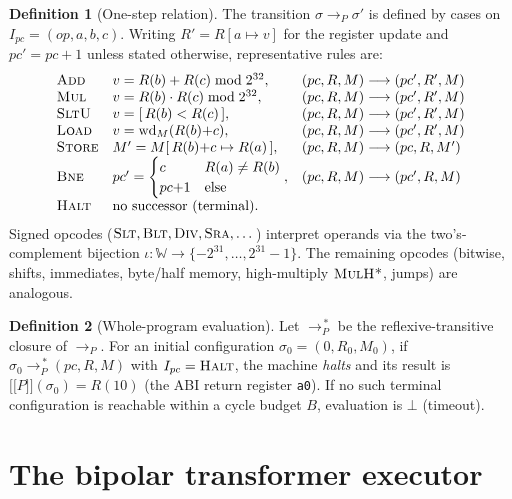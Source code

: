 \documentclass[11pt]{article}
\theoremstyle{definition}
\newtheorem{definition}{Definition}
\theoremstyle{plain}
\theoremstyle{remark}
\newcommand{\Word}{\mathbb{W}}
\newcommand{\step}{\longrightarrow}
\providecommand{\llbracket}{\mathopen{[\![}}
\providecommand{\rrbracket}{\mathclose{]\!]}}
\newcommand{\sem}[1]{\llbracket #1 \rrbracket}
\begin{document}
\begin{definition}[One-step relation]\label{def:step}
The transition $\sigma \step_P \sigma'$ is defined by cases on $I_{pc} = (\mathit{op},a,b,c)$. Writing
$R'=R[a \mapsto v]$ for the register update and $pc'=pc{+}1$ unless stated otherwise, representative
rules are:
\[
\begin{array}{llll}
\textsc{Add}   & v = R(b) + R(c) \bmod 2^{32}, & (pc,R,M)\step(pc',R',M) \\
\textsc{Mul}   & v = R(b)\cdot R(c) \bmod 2^{32}, & (pc,R,M)\step(pc',R',M) \\
\textsc{SltU}  & v = [\,R(b) < R(c)\,],          & (pc,R,M)\step(pc',R',M) \\
\textsc{Load}  & v = \mathrm{wd}_M(R(b){+}c),     & (pc,R,M)\step(pc',R',M) \\
\textsc{Store} & M' = M[\,R(b){+}c \mapsto R(a)\,], & (pc,R,M)\step(pc,R,M') \\
\textsc{Bne}   & pc' = \begin{cases} c & R(a)\neq R(b)\\ pc{+}1 & \text{else}\end{cases}, & (pc,R,M)\step(pc',R,M)\\
\textsc{Halt}  & \multicolumn{2}{l}{\text{no successor (terminal).}}
\end{array}
\]
Signed opcodes ($\textsc{Slt}, \textsc{Blt}, \textsc{Div}, \textsc{Sra}, \dots$) interpret operands via
the two's-complement bijection $\iota:\Word\to\{-2^{31},\dots,2^{31}{-}1\}$. The remaining opcodes
(bitwise, shifts, immediates, byte/half memory, high-multiply $\textsc{MulH*}$, jumps) are analogous.
\end{definition}

\begin{definition}[Whole-program evaluation]
Let $\step_P^{\,*}$ be the reflexive-transitive closure of $\step_P$. For an initial configuration
$\sigma_0=(0,R_0,M_0)$, if $\sigma_0 \step_P^{\,*} (pc,R,M)$ with $I_{pc}=\textsc{Halt}$, the machine
\emph{halts} and its result is $\sem{P}(\sigma_0) = R(10)$ (the ABI return register \texttt{a0}). If no
such terminal configuration is reachable within a cycle budget $B$, evaluation is $\bot$ (timeout).
\end{definition}

\section{The bipolar transformer executor}\label{sec:transformer}
\end{document}
